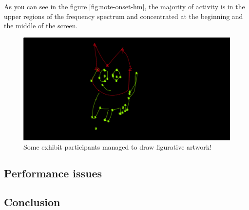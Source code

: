 \documentclass[]{article}
\begin{document}
As you can see in the figure \ref{fig:note-onset-hm}, the majority of
activity is in the upper regions of the frequency spectrum and
concentrated at the beginning and the middle of the screen.

\begin{figure}[h]
\centering
\includegraphics[width=1.0\textwidth]{./assets/exhibit-cat.png}
\caption{Some exhibit participants managed to draw figurative artwork!}
\label{fig:exhibit-cat}
\end{figure}

\pagebreak

\subsection{Performance issues}\label{performance-issues}

\subsection{Conclusion}\label{conclusion}
\end{document}
